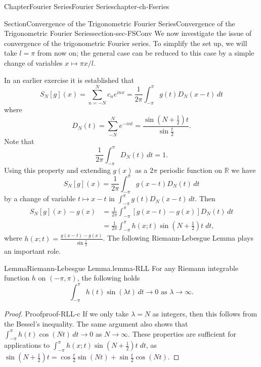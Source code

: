 \documentclass[oneside,10pt,]{book}
\numberwithin{equation}{section}
\newcommand{\bbR}{\mathbb{R}}
\newcommand{\amp}{&}
\begin{document}
\begin{chapterptx}{Chapter}{Fourier Series}{}{Fourier Series}{}{}{chapter-ch-Fseries}
\begin{sectionptx}{Section}{Convergence of the Trigonometric Fourier Series}{}{Convergence of the Trigonometric Fourier Series}{}{}{section-sec-FSConv}
We now investigate the issue of convergence of the trigonometric Fourier series. To simplify the set up, we will take \(l=\pi\) from now on; the general case can be reduced to this case by a simple change of variables \(x\mapsto \pi x/l\).%
\par
In an earlier exercise it is established that%
\begin{equation*}
S_{N}[g](x)=\sum_{n=-N}^{N} c_{n} e^{i nx}=
\frac{1}{2\pi} \int_{-\pi}^{\pi}g(t) D_{N}(x-t)\, dt
\end{equation*}
where%
\begin{equation*}
D_{N}(t)= \sum_{-N}^{N} e^{-i n t}=\frac{\sin (N+\frac 12)t }{\sin\frac { t}{2}}.
\end{equation*}
Note that%
\begin{equation*}
\frac{1}{2\pi} \int_{-\pi}^{\pi} D_{N}(t)\, dt=1.
\end{equation*}
Using this property and extending \(g(x)\) as a \(2\pi\) periodic function on \(\bbR\) we have%
\begin{equation*}
S_N[g]( x)= \frac{1}{2\pi} \int_{-\pi}^{\pi} g(x-t) D_{N}(t)\, dt
\end{equation*}
by a change of variable \(t \mapsto x-t\) in \(\int_{-\pi}^{\pi} g(t)D_{N}(x-t)\, dt\). Then%
\begin{align*}
S_N[g]( x)-g(x)\amp = \frac{1}{2\pi} \int_{-\pi}^{\pi}[g(x-t) -g(x)] D_{N}(t)\, dt\\
\amp=\frac{1}{2\pi} \int_{-\pi}^{\pi}
h(x; t) \sin (N+\frac 12)t\; dt,
\end{align*}
where \(h(x; t)=\frac{g(x-t) -g(x)}{\sin \frac t2}\). The following Riemann-Lebesgue Lemma plays an important role.%
\begin{lemma}{Lemma}{Riemann-Lebesgue Lemma.}{}{lemma-RLL}%
For any Riemann integrable function \(h\) on \((-\pi, \pi)\), the following holds%
\begin{equation*}
\int_{-\pi}^{\pi} h(t)\sin(\lambda t)\, dt\to 0 \text{ as } \lambda \to \infty.
\end{equation*}
\end{lemma}
\begin{proof}{Proof}{}{proof-RLL-c}
If we only take \(\lambda=N\) as integers, then this follows from the Bessel's inequality. The same argument also shows that \(\int_{-\pi}^{\pi} h(t)\cos(N t)\, dt\to 0\) as \(N\to \infty\). These properties are sufficient for applications to \(\int_{-\pi}^{\pi}
h(x; t) \sin (N+\frac 12)t\; dt\), as \(\sin (N+\frac 12)t=\cos\frac t2 \sin(Nt)+\sin\frac t2 \cos(Nt)\).%
\par

\end{proof}
\end{sectionptx}
\end{chapterptx}
\end{document}
